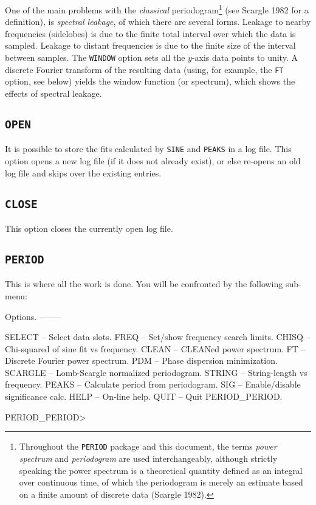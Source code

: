 \documentclass[twoside,11pt,noabs,nolof]{starlink}
\begin{document}
One of the main problems with the \emph{classical}
periodogram\footnote{Throughout the \texttt{PERIOD} package and this document, the
terms \emph{power spectrum} and \emph{periodogram} are used interchangeably,
although strictly speaking the power spectrum is a theoretical quantity defined
as an integral over continuous time, of which the periodogram is merely an
estimate based on a finite amount of discrete data (Scargle 1982).}  (see
Scargle 1982 for a definition), is \emph{spectral leakage}, of which there are
several forms. Leakage to nearby frequencies (sidelobes) is due to the finite
total interval over which the data is sampled. Leakage to distant frequencies
is due to the finite size of the interval between samples. The \texttt{WINDOW}
option sets all the $y$-axis data points to unity. A discrete Fourier transform
of the resulting data (using, for example, the \texttt{FT} option, see below)
yields the window function (or spectrum), which shows the effects of spectral
leakage.

\subsection*{\texttt{OPEN}}

It is possible to store the fits calculated by \texttt{SINE} and \texttt{PEAKS} in a
log file. This option opens a new log file (if it does not already exist), or
else re-opens an old log file and skips over the existing entries.

\subsection*{\texttt{CLOSE}}

This option closes the currently open log file.

\subsection*{\texttt{PERIOD}}

This is where all the work is done. You will be confronted by the following
sub-menu:

\begin{terminalv}
Options.
--------

SELECT   --  Select data slots.
FREQ     --  Set/show frequency search limits.
CHISQ    --  Chi-squared of sine fit vs frequency.
CLEAN    --  CLEANed power spectrum.
FT       --  Discrete Fourier power spectrum.
PDM      --  Phase dispersion minimization.
SCARGLE  --  Lomb-Scargle normalized periodogram.
STRING   --  String-length vs frequency.
PEAKS    --  Calculate period from periodogram.
SIG      --  Enable/disable significance calc.
HELP     --  On-line help.
QUIT     --  Quit PERIOD_PERIOD.

PERIOD_PERIOD>
\end{terminalv}
\end{document}
